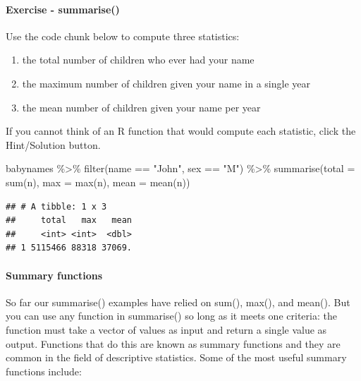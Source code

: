 \documentclass[
]{article}
\newenvironment{Shaded}{\begin{snugshade}}{\end{snugshade}}
\newcommand{\AttributeTok}[1]{\textcolor[rgb]{0.77,0.63,0.00}{#1}}
\newcommand{\FunctionTok}[1]{\textcolor[rgb]{0.00,0.00,0.00}{#1}}
\newcommand{\NormalTok}[1]{#1}
\newcommand{\SpecialCharTok}[1]{\textcolor[rgb]{0.00,0.00,0.00}{#1}}
\newcommand{\StringTok}[1]{\textcolor[rgb]{0.31,0.60,0.02}{#1}}
\providecommand{\tightlist}{%
  \setlength{\itemsep}{0pt}\setlength{\parskip}{0pt}}
\begin{document}
\hypertarget{exercise---summarise}{%
\paragraph{Exercise - summarise()}\label{exercise---summarise}}

Use the code chunk below to compute three statistics:

\begin{enumerate}
\def\labelenumi{\arabic{enumi}.}
\tightlist
\item
  the total number of children who ever had your name
\item
  the maximum number of children given your name in a single year
\item
  the mean number of children given your name per year
\end{enumerate}

If you cannot think of an R function that would compute each statistic,
click the Hint/Solution button.

\begin{Shaded}
\begin{Highlighting}[]
\NormalTok{babynames }\SpecialCharTok{\%\textgreater{}\%} 
  \FunctionTok{filter}\NormalTok{(name }\SpecialCharTok{==} \StringTok{"John"}\NormalTok{, sex }\SpecialCharTok{==} \StringTok{"M"}\NormalTok{) }\SpecialCharTok{\%\textgreater{}\%} 
  \FunctionTok{summarise}\NormalTok{(}\AttributeTok{total =} \FunctionTok{sum}\NormalTok{(n), }\AttributeTok{max =} \FunctionTok{max}\NormalTok{(n), }\AttributeTok{mean =} \FunctionTok{mean}\NormalTok{(n))}
\end{Highlighting}
\end{Shaded}

\begin{verbatim}
## # A tibble: 1 x 3
##     total   max   mean
##     <int> <int>  <dbl>
## 1 5115466 88318 37069.
\end{verbatim}

\hypertarget{summary-functions}{%
\paragraph{Summary functions}\label{summary-functions}}

So far our summarise() examples have relied on sum(), max(), and mean().
But you can use any function in summarise() so long as it meets one
criteria: the function must take a vector of values as input and return
a single value as output. Functions that do this are known as summary
functions and they are common in the field of descriptive statistics.
Some of the most useful summary functions include:
\end{document}
